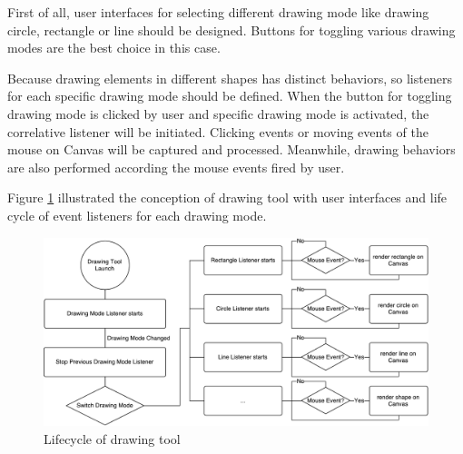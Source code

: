 First of all, user interfaces for selecting different drawing mode like drawing circle, rectangle or line should be designed. Buttons for toggling various drawing modes are the best choice in this case.

Because drawing elements in different shapes has distinct behaviors, so listeners for each specific drawing mode should be defined. When the button for toggling drawing mode is clicked by user and specific drawing mode is activated, the correlative listener will be initiated. Clicking events or moving events of the mouse on Canvas will be captured and processed. Meanwhile, drawing behaviors are also performed according the mouse events fired by user.

Figure \ref{fig:drawing-tool-concept} illustrated the conception of drawing tool with user interfaces and life cycle of event listeners for each drawing mode.

\begin{figure}[!htbp]
  \centering
    \includegraphics[width=1\textwidth]{Figures/concept-drawing-tool.pdf}
  \caption{Lifecycle of drawing tool}
  \label{fig:drawing-tool-concept}
\end{figure}

